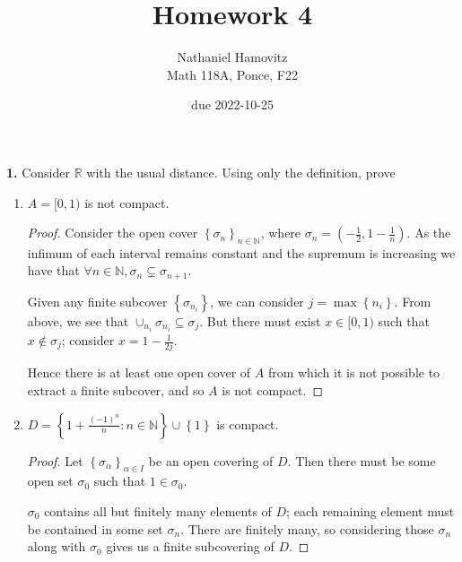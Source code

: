 \documentclass{article}
\newcommand{\R}{\mathbb{R}}
\newcommand{\N}{\mathbb{N}}
\newcommand{\set}[1]{\left\{ #1 \right\}}
\newcommand{\paren}[1]{\left( #1 \right)}
\begin{document}
\renewcommand{\labelenumi}{(\alph{enumi})}


\title{Homework 4} %
\author{Nathaniel Hamovitz\\Math 118A, Ponce, F22}
\date{due 2022-10-25}

\maketitle

\textbf{1. }
Consider $\R$ with the usual distance. Using only the definition, prove

\begin{enumerate}
    \item  %
    $A = [0, 1)$ is not compact.
    \begin{proof}
        Consider the open cover $\set{\sigma_n}_{n \in \N}$, where $\sigma_n = \paren{-\frac{1}{2}, 1 - \frac{1}{n}}$. As the infimum of each interval remains constant and the supremum is increasing we have that $\forall n \in \N, \sigma_n \subsetneq \sigma_{n + 1}$. 
        
        Given any finite subcover $\set{\sigma_{n_i}}$, we can consider $j = \max \set{n_i}$. From above, we see that $\cup_{n_i} \sigma_{n_i} \subseteq \sigma_j$. But there must exist $x \in [0, 1)$ such that $x \notin \sigma_j$; consider $x = 1 - \frac{1}{2j}$. 

        Hence there is at least one open cover of $A$ from which it is not possible to extract a finite subcover, and so $A$ is not compact.
    \end{proof}


    \item  %
    $D = \set{1 + \frac{(-1)^{n}}{n} : n \in \N} \cup \set{1}$ is compact.
    \begin{proof}
        Let $\set{\sigma_\alpha}_{\alpha \in I}$ be an open covering of $D$. Then there must be some open set $\sigma_0$ such that $1 \in \sigma_0$. 

        $\sigma_0$ contains all but finitely many elements of $D$; each remaining element must be contained in some set $\sigma_n$. There are finitely many, so considering those $\sigma_n$ along with $\sigma_0$ gives us a finite subcovering of $D$.        
    \end{proof}
\end{enumerate}
\end{document}
